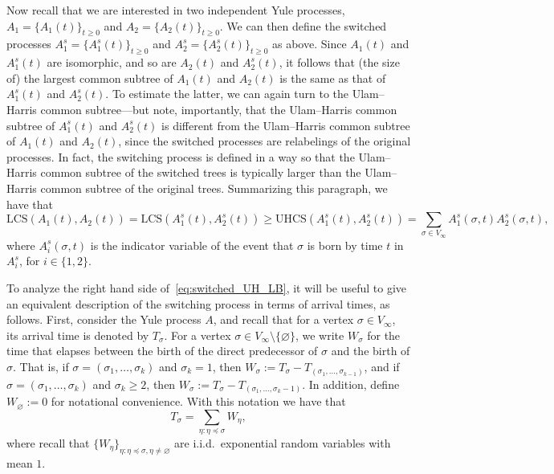 \documentclass[11pt]{article}
\numberwithin{equation}{section}
\newcommand{\LCS}{\mathrm{LCS}} %
\newcommand{\UHCS}{\mathrm{UHCS}} %
\theoremstyle{definition}
\begin{document}
Now recall that we are interested in two independent Yule processes, 
$A_{1} = \{ A_{1}(t) \}_{t \geq 0}$ and $A_{2} = \{ A_{2}(t) \}_{t \geq 0}$. 
We can then define the switched processes 
$A_{1}^{s} = \{ A_{1}^{s}(t) \}_{t \geq 0}$ and $A_{2}^{s} = \{ A_{2}^{s}(t) \}_{t \geq 0}$
as above. 
Since $A_{1}(t)$ and $A_{1}^{s}(t)$ are isomorphic, 
and so are $A_{2}(t)$ and $A_{2}^{s}(t)$, 
it follows that (the size of) the largest common subtree of $A_{1}(t)$ and $A_{2}(t)$ 
is the same as that of $A_{1}^{s}(t)$ and $A_{2}^{s}(t)$. 
To estimate the latter, we can again turn to the Ulam--Harris common subtree---but note, importantly, that the Ulam--Harris common subtree of $A_{1}^{s}(t)$ and $A_{2}^{s}(t)$  
is different from the Ulam--Harris common subtree of $A_{1}(t)$ and $A_{2}(t)$, 
since the switched processes are relabelings of the original processes. 
In fact, the switching process is defined in a way so that the Ulam--Harris common subtree of the switched trees is typically larger than the Ulam--Harris common subtree of the original trees. 
Summarizing this paragraph, we have that
\begin{equation}\label{eq:switched_UH_LB}
\LCS(A_{1}(t), A_{2}(t)) 
= \LCS(A_{1}^{s}(t), A_{2}^{s}(t)) 
\geq \UHCS(A_{1}^{s}(t), A_{2}^{s}(t)) 
= \sum_{\sigma \in V_{\infty}} A_{1}^{s}(\sigma, t) A_{2}^{s}(\sigma,t),
\end{equation}
where $A_{i}^{s}(\sigma,t)$ is the indicator variable of the event that $\sigma$ is born by time $t$ in $A_{i}^{s}$, for $i \in \{1,2\}$. 

To analyze the right hand side of~\eqref{eq:switched_UH_LB}, it will be useful to give an equivalent description of the switching process in terms of arrival times, as follows. 
First, consider the Yule process $A$, and recall that for a vertex $\sigma \in V_{\infty}$, 
its arrival time is denoted by $T_{\sigma}$. 
For a vertex $\sigma \in V_{\infty} \setminus \{\varnothing\}$, 
we write $W_{\sigma}$ for the time that elapses between the birth of the direct predecessor of $\sigma$ and the birth of  $\sigma$. That is, if $\sigma = (\sigma_{1}, \ldots, \sigma_{k})$ and $\sigma_{k} = 1$, 
then $W_{\sigma} := T_{\sigma} - T_{(\sigma_{1}, \ldots, \sigma_{k-1})}$, and if $\sigma = (\sigma_{1}, \ldots, \sigma_{k})$ and $\sigma_{k} \geq 2$, 
then $W_{\sigma} := T_{\sigma} - T_{(\sigma_{1}, \ldots, \sigma_{k} - 1)}$. 
In addition, define $W_{\varnothing} := 0$ for notational convenience. 
With this notation we have that 
\begin{equation}\label{eq:arrival_time_sum_of_iid}
T_{\sigma} = \sum_{\eta: \eta \preccurlyeq \sigma} W_{\eta},
\end{equation}
where recall that 
$\{W_{\eta}\}_{\eta: \eta \preccurlyeq \sigma, \eta \neq \varnothing}$ 
are i.i.d.\ exponential random variables with mean $1$.
\end{document}
